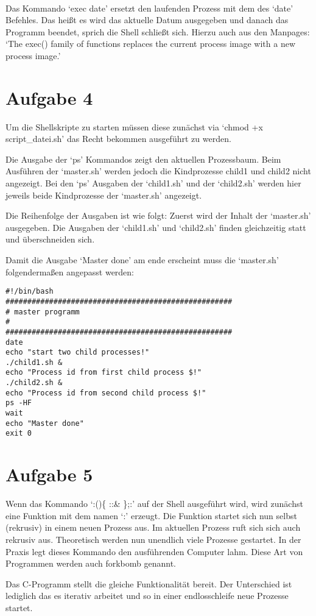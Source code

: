 \documentclass[a4paper]{article}
\begin{document}
\paragraph{}
Das Kommando `exec date' ersetzt den laufenden Prozess mit dem des `date' Befehles.
Das heißt es wird das aktuelle Datum ausgegeben und danach das Programm beendet, sprich
die Shell schließt sich. Hierzu auch aus den Manpages: 
`The  exec() family of functions replaces the current process image with a new process image.'

\section{Aufgabe 4}
Um die Shellskripte zu starten müssen diese zunächst via `chmod +x script\_datei.sh'
das Recht bekommen ausgeführt zu werden.

Die Ausgabe der `ps' Kommandos zeigt den aktuellen Prozessbaum. Beim Ausführen
der `master.sh' werden jedoch die Kindprozesse child1 und child2 nicht angezeigt.
Bei den `ps' Ausgaben der `child1.sh' und der `child2.sh' werden hier jeweils
beide Kindprozesse der `master.sh' angezeigt.

Die Reihenfolge der Ausgaben ist wie folgt: Zuerst wird der Inhalt der `master.sh'
ausgegeben. Die Ausgaben der `child1.sh' und `child2.sh' finden gleichzeitig statt
und überschneiden sich.

Damit die Ausgabe `Master done' am ende erscheint muss die `master.sh' folgendermaßen
angepasst werden:

\begin{verbatim}
#!/bin/bash
####################################################
# master programm
#
####################################################
date
echo "start two child processes!"
./child1.sh &
echo "Process id from first child process $!"
./child2.sh &
echo "Process id from second child process $!"
ps -HF
wait
echo "Master done"
exit 0
\end{verbatim}

\section{Aufgabe 5}

Wenn das Kommando `:()\{ :\textbar:\& \};:' auf der Shell ausgeführt wird,
wird zunächst eine Funktion mit dem namen `:' erzeugt.
Die Funktion startet sich nun selbst (rekrusiv) in einem neuen Prozess aus. Im aktuellen
Prozess ruft sich sich auch rekrusiv aus.
Theoretisch werden nun unendlich viele Prozesse gestartet.
In der Praxis legt dieses Kommando den ausführenden
Computer lahm. Diese Art von Programmen werden auch forkbomb genannt.

Das C-Programm stellt die gleiche Funktionalität bereit. Der Unterschied ist lediglich das
es iterativ arbeitet und so in einer endlosschleife neue Prozesse startet.
\end{document}
